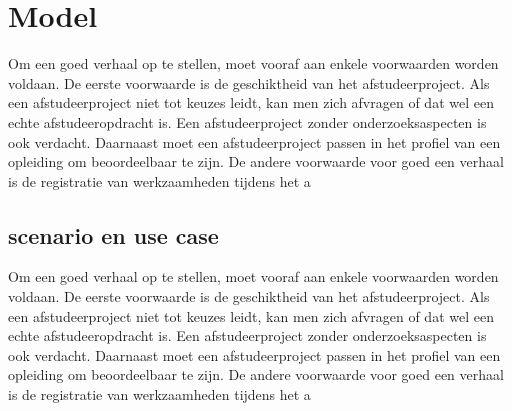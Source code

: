 
\newpage

\section{Model}



Om een goed verhaal op te stellen, moet vooraf aan enkele voorwaarden
worden voldaan. De eerste voorwaarde is de geschiktheid van het
afstudeerproject. Als een afstudeerproject niet tot keuzes leidt, kan
men zich afvragen of dat wel een echte afstudeeropdracht is. Een
afstudeerproject zonder onderzoeksaspecten is ook verdacht. Daarnaast
moet een afstudeerproject passen in het profiel van een opleiding om
beoordeelbaar te zijn. De andere voorwaarde voor goed een verhaal is
de registratie van werkzaamheden tijdens het a




\begin{center}
\end{center}
\subsection{scenario en use case}



Om een goed verhaal op te stellen, moet vooraf aan enkele voorwaarden
worden voldaan. De eerste voorwaarde is de geschiktheid van het
afstudeerproject. Als een afstudeerproject niet tot keuzes leidt, kan
men zich afvragen of dat wel een echte afstudeeropdracht is. Een
afstudeerproject zonder onderzoeksaspecten is ook verdacht. Daarnaast
moet een afstudeerproject passen in het profiel van een opleiding om
beoordeelbaar te zijn. De andere voorwaarde voor goed een verhaal is
de registratie van werkzaamheden tijdens het a

\begin{usecase}
\end{usecase}
